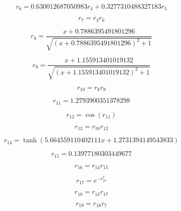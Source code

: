 \begin{equation}
r_{6}=0.630012687050983 r_{4} + 0.3277310488327183 r_{5}
\end{equation}


\begin{equation}
r_{7}=r_{3} r_{6}
\end{equation}


\begin{equation}
r_{8}=\frac{x + 0.7886395491801296}{\sqrt{\left(x + 0.7886395491801296\right)^{2} + 1}}
\end{equation}


\begin{equation}
r_{9}=\frac{x + 1.155913401019132}{\sqrt{\left(x + 1.155913401019132\right)^{2} + 1}}
\end{equation}


\begin{equation}
r_{10}=r_{8} r_{9}
\end{equation}


\begin{equation}
r_{11}=1.2793900351378298
\end{equation}


\begin{equation}
r_{12}=\cos{\left(r_{11} \right)}
\end{equation}


\begin{equation}
r_{13}=r_{10} r_{12}
\end{equation}


\begin{equation}
r_{14}=\tanh{\left(5.664559110402111 x + 1.2731394149543833 \right)}
\end{equation}


\begin{equation}
r_{15}=0.13977180303449677
\end{equation}


\begin{equation}
r_{16}=r_{14} r_{15}
\end{equation}


\begin{equation}
r_{17}=e^{- r_{16}^{2}}
\end{equation}


\begin{equation}
r_{18}=r_{13} r_{17}
\end{equation}


\begin{equation}
r_{19}=r_{18} r_{7}
\end{equation}


